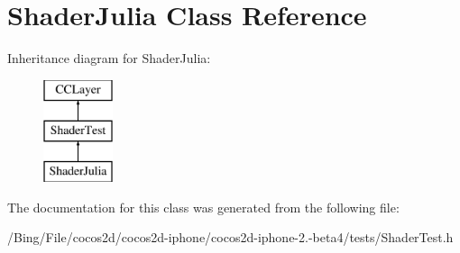 \hypertarget{interface_shader_julia}{\section{Shader\-Julia Class Reference}
\label{interface_shader_julia}
}
Inheritance diagram for Shader\-Julia\-:\begin{figure}[H]
\begin{center}
\leavevmode
\includegraphics[height=3.000000cm]{interface_shader_julia}
\end{center}
\end{figure}


The documentation for this class was generated from the following file\-:\begin{DoxyCompactItemize}
\item 
/\-Bing/\-File/cocos2d/cocos2d-\/iphone/cocos2d-\/iphone-\/2.-\/beta4/tests/Shader\-Test.\-h\end{DoxyCompactItemize}
